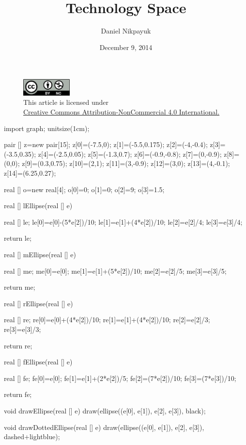 \documentclass[twoside]{article}
\title{Technology Space}
\author{Daniel Nikpayuk}
\date{December 9, 2014}
\begin{document}
\maketitle
\thispagestyle{empty}

\begin{figure}[h]
\centering
\includegraphics[width=1in]{../../../cc-by-nc.png}\\[0.1in]
\tiny This article is licensed under \\
\href{http://creativecommons.org/licenses/by-nc/4.0/}
{Creative Commons Attribution-NonCommercial 4.0 International.}\\[0.3in]
\end{figure}

\newpage

\begin{asydef}
import graph;
unitsize(1cm);

pair [] z=new pair[15];
z[0]=(-7.5,0);
z[1]=(-5.5,0.175);
z[2]=(-4,-0.4);
z[3]=(-3.5,0.35);
z[4]=(-2.5,0.05);
z[5]=(-1.3,0.7);
z[6]=(-0.9,-0.8);
z[7]=(0,-0.9);
z[8]=(0,0);
z[9]=(0.3,0.75);
z[10]=(2,1);
z[11]=(3,-0.9);
z[12]=(3,0);
z[13]=(4,-0.1);
z[14]=(6.25,0.27);

real [] o=new real[4];
o[0]=0;
o[1]=0;
o[2]=9;
o[3]=1.5;

real [] lEllipse(real [] e)
{
	real [] le;
	le[0]=e[0]-(5*e[2])/10;
	le[1]=e[1]+(4*e[2])/10;
	le[2]=e[2]/4;
	le[3]=e[3]/4;

	return le;
}

real [] mEllipse(real [] e)
{
	real [] me;
	me[0]=e[0];
	me[1]=e[1]+(5*e[2])/10;
	me[2]=e[2]/5;
	me[3]=e[3]/5;

	return me;
}

real [] rEllipse(real [] e)
{
	real [] re;
	re[0]=e[0]+(4*e[2])/10;
	re[1]=e[1]+(4*e[2])/10;
	re[2]=e[2]/3;
	re[3]=e[3]/3;

	return re;
}

real [] fEllipse(real [] e)
{
	real [] fe;
	fe[0]=e[0];
	fe[1]=e[1]+(2*e[2])/5;
	fe[2]=(7*e[2])/10;
	fe[3]=(7*e[3])/10;

	return fe;
}

void drawEllipse(real [] e)
{
	draw(ellipse((e[0], e[1]), e[2], e[3]), black);
}

void drawDottedEllipse(real [] e)
{
	draw(ellipse((e[0], e[1]), e[2], e[3]), dashed+lightblue);
}

\end{asydef}
\end{document}
